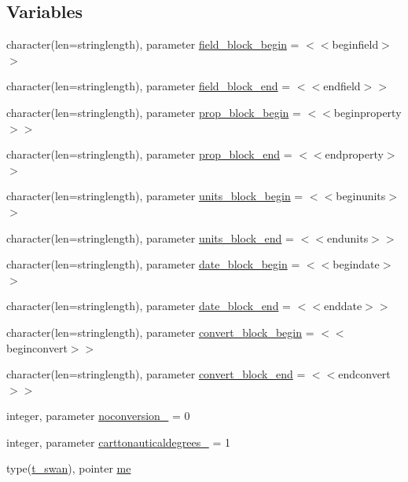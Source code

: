 \subsection*{Variables}
\begin{DoxyCompactItemize}
\item 
character(len=stringlength), parameter \mbox{\hyperlink{namespacemoduleswan_af262e5ee084e83d947faf8fe673eedba}{field\+\_\+block\+\_\+begin}} = \textquotesingle{}$<$$<$beginfield$>$$>$\textquotesingle{}
\item 
character(len=stringlength), parameter \mbox{\hyperlink{namespacemoduleswan_a725d01d351dc51cdd8457e9307160045}{field\+\_\+block\+\_\+end}} = \textquotesingle{}$<$$<$endfield$>$$>$\textquotesingle{}
\item 
character(len=stringlength), parameter \mbox{\hyperlink{namespacemoduleswan_a709bb35abf9448cad048a720a8026488}{prop\+\_\+block\+\_\+begin}} = \textquotesingle{}$<$$<$beginproperty$>$$>$\textquotesingle{}
\item 
character(len=stringlength), parameter \mbox{\hyperlink{namespacemoduleswan_af8388be7d822a28085ad5d49202c5594}{prop\+\_\+block\+\_\+end}} = \textquotesingle{}$<$$<$endproperty$>$$>$\textquotesingle{}
\item 
character(len=stringlength), parameter \mbox{\hyperlink{namespacemoduleswan_aee5466ad2e84fab2104f2237dbefc18c}{units\+\_\+block\+\_\+begin}} = \textquotesingle{}$<$$<$beginunits$>$$>$\textquotesingle{}
\item 
character(len=stringlength), parameter \mbox{\hyperlink{namespacemoduleswan_acc49f731e5b61076515a1cd444d0cdc3}{units\+\_\+block\+\_\+end}} = \textquotesingle{}$<$$<$endunits$>$$>$\textquotesingle{}
\item 
character(len=stringlength), parameter \mbox{\hyperlink{namespacemoduleswan_a8c8326671daffe1b4b08ebc63b54b443}{date\+\_\+block\+\_\+begin}} = \textquotesingle{}$<$$<$begindate$>$$>$\textquotesingle{}
\item 
character(len=stringlength), parameter \mbox{\hyperlink{namespacemoduleswan_a9443aa6ce9e6b9a8f827fdf6f0495866}{date\+\_\+block\+\_\+end}} = \textquotesingle{}$<$$<$enddate$>$$>$\textquotesingle{}
\item 
character(len=stringlength), parameter \mbox{\hyperlink{namespacemoduleswan_a04c38ac30f15d12e0dbd95367f681790}{convert\+\_\+block\+\_\+begin}} = \textquotesingle{}$<$$<$beginconvert$>$$>$\textquotesingle{}
\item 
character(len=stringlength), parameter \mbox{\hyperlink{namespacemoduleswan_a69adb794cbede34bda4634aadf1952e0}{convert\+\_\+block\+\_\+end}} = \textquotesingle{}$<$$<$endconvert$>$$>$\textquotesingle{}
\item 
integer, parameter \mbox{\hyperlink{namespacemoduleswan_a1dcf0fdd35dc9e5c127139d37e3eeed5}{noconversion\+\_\+}} = 0
\item 
integer, parameter \mbox{\hyperlink{namespacemoduleswan_a7dcf058a93532c9c6a8d2b3e0089c082}{carttonauticaldegrees\+\_\+}} = 1
\item 
type(\mbox{\hyperlink{structmoduleswan_1_1t__swan}{t\+\_\+swan}}), pointer \mbox{\hyperlink{namespacemoduleswan_a0b7319827ebd8a624b35bfba2c2ff6e1}{me}}
\end{DoxyCompactItemize}



